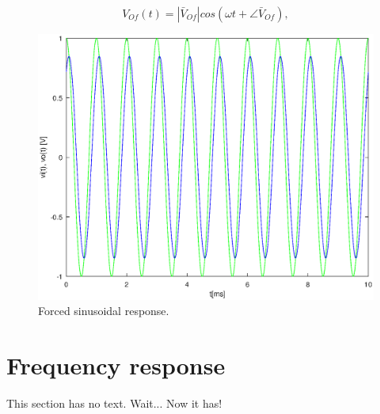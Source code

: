 \begin{equation}
  V_{Of}(t) = |\bar{V}_{Of}| cos(\omega t + \angle \bar{V}_{Of}),
  \label{eq:vo_for}
\end{equation}


\begin{figure}[H] \centering
\includegraphics[width=0.8\linewidth]{forced.eps}
\caption{Forced sinusoidal response.}
\label{fig:forced}
\end{figure}

\section{Frequency response}
This section has no text. Wait... Now it has!


